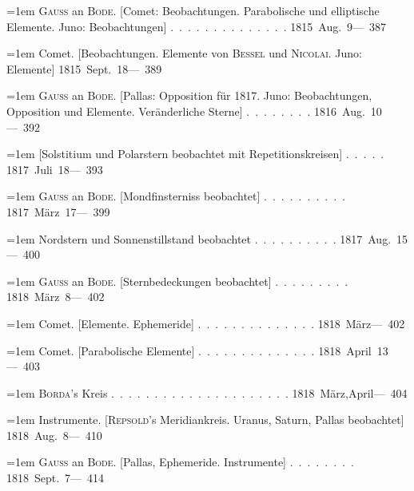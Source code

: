 \noindent\hangindent=1em \textsc{Gauss} an \textsc{Bode}. [Comet: Beobachtungen. Parabolische und elliptische Elemente. Juno: Beobachtungen] \mbox{.\ .\ .\ .\ .\ .\ .\ .\ .\ .\ .\ .\ .\ .} \hfill\mbox{1815 Aug. 9}\quad\mbox{--- 387}\par\smallskip
\noindent\hangindent=1em Comet. [Beobachtungen. Elemente von \textsc{Bessel} und \textsc{Nicolai}. Juno: Elemente] \hfill\mbox{1815 Sept. 18}\quad\mbox{--- 389}\par\smallskip
\noindent\hangindent=1em \textsc{Gauss} an \textsc{Bode}. [Pallas: Opposition für 1817. Juno: Beobachtungen, Opposition und Elemente. Veränderliche Sterne] \mbox{.\ .\ .\ .\ .\ .\ .\ .} \hfill\mbox{1816 Aug. 10}\quad\mbox{--- 392}\par\smallskip
\noindent\hangindent=1em [Solstitium und Polarstern beobachtet mit Repetitionskreisen] \mbox{.\ .\ .\ .\ .} \hfill\mbox{1817 Juli 18}\quad\mbox{--- 393}\par\smallskip
\noindent\hangindent=1em \textsc{Gauss} an \textsc{Bode}. [Mondfinsterniss beobachtet] \mbox{.\ .\ .\ .\ .\ .\ .\ .\ .\ .} \hfill\mbox{1817 März 17}\quad\mbox{--- 399}\par\smallskip
\noindent\hangindent=1em \hspace{1em}Nordstern und Sonnenstillstand beobachtet \mbox{.\ .\ .\ .\ .\ .\ .\ .\ .\ .} \hfill\mbox{1817 Aug. 15}\quad\mbox{--- 400}\par\smallskip
\noindent\hangindent=1em \textsc{Gauss} an \textsc{Bode}. [Sternbedeckungen beobachtet] \mbox{.\ .\ .\ .\ .\ .\ .\ .\ .} \hfill\mbox{1818 März 8}\quad\mbox{--- 402}\par\smallskip
\noindent\hangindent=1em Comet. [Elemente. Ephemeride] \mbox{.\ .\ .\ .\ .\ .\ .\ .\ .\ .\ .\ .\ .\ .} \hfill\mbox{1818 März}\quad\mbox{--- 402}\par\smallskip
\noindent\hangindent=1em Comet. [Parabolische Elemente] \mbox{.\ .\ .\ .\ .\ .\ .\ .\ .\ .\ .\ .\ .\ .} \hfill\mbox{1818 April 13}\quad\mbox{--- 403}\par\smallskip
\noindent\hangindent=1em \textsc{Borda}'s Kreis \mbox{.\ .\ .\ .\ .\ .\ .\ .\ .\ .\ .\ .\ .\ .\ .\ .\ .\ .\ .\ .\ .} \hfill\mbox{1818 März,April}\quad\mbox{--- 404}\par\smallskip
\noindent\hangindent=1em Instrumente. [\textsc{Repsold}'s Meridiankreis. Uranus, Saturn, Pallas beobachtet] \hfill\mbox{1818 Aug. 8}\quad\mbox{--- 410}\par\smallskip
\noindent\hangindent=1em \textsc{Gauss} an \textsc{Bode}. [Pallas, Ephemeride. Instrumente] \mbox{.\ .\ .\ .\ .\ .\ .\ .} \hfill\mbox{1818 Sept. 7}\quad\mbox{--- 414}\par\smallskip
